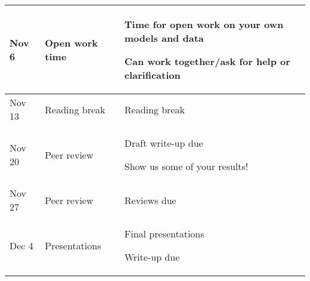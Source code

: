 \documentclass[11pt]{article}
\newcommand{\tabit}{\par\textbullet\phantom{ }}
\begin{document}
\begin{table}[h]
\begin{tabular}{p{2cm}|p{4cm}|p{9cm}}
Nov 6 & Open work time & \tabit Time for open work on your own models and data \tabit Can work together/ask for help or clarification \\ \hline

Nov 13 & Reading break & Reading break \\ \hline

Nov 20 & Peer review & \tabit Draft write-up due \tabit Show us some of your results! \\ \hline

Nov 27 & Peer review & \tabit Reviews due \\ \hline

Dec 4 & Presentations & \tabit Final presentations \tabit Write-up due \\ 

\end{tabular}
\end{table}
\end{document}
